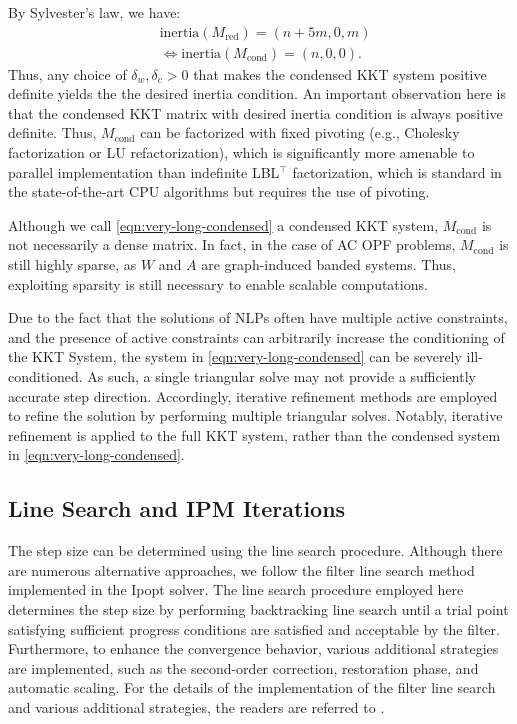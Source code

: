 By Sylvester's law, we have:
\begin{align*}
  &\text{inertia}(M_\text{red}) = (n+5m,0,m)\\
  &\iff \text{inertia}(M_\text{cond}) = (n,0,0).
\end{align*}
Thus, any choice of $\delta_w,\delta_c>0$ that makes the condensed KKT
system positive definite yields the the desired inertia condition.
An important observation here is that the condensed KKT matrix
with desired inertia condition is always positive definite.
Thus, $M_{\text{cond}}$ can be factorized with fixed pivoting (e.g.,
Cholesky factorization or LU refactorization), which is significantly
more amenable to parallel implementation than indefinite LBL$^\top$
factorization, which is standard in the state-of-the-art CPU
algorithms but requires the use of pivoting.

Although we call \eqref{eqn:very-long-condensed} a condensed KKT system,
$M_\text{cond}$ is not necessarily a dense matrix. In fact, in the case of
AC OPF problems, $M_\text{cond}$ is still highly sparse, as $W$
and $A$ are graph-induced banded systems. Thus, exploiting sparsity is
still necessary to enable scalable computations.

Due to the fact that the solutions of NLPs often have multiple active
constraints, and the presence of active constraints can arbitrarily
increase the conditioning of the KKT System, the system in
\eqref{eqn:very-long-condensed} can be severely
ill-conditioned. As such, a single triangular solve may not provide a
sufficiently accurate step direction. Accordingly, iterative
refinement methods are employed to refine the solution by performing
multiple triangular solves. Notably, iterative refinement is applied
to the full KKT system, rather than the condensed system in
\eqref{eqn:very-long-condensed}.

\subsection{Line Search and IPM Iterations}

The step size can be determined using the line search procedure.
Although there are numerous alternative approaches, we follow the
filter line search method implemented in the Ipopt solver. The line
search procedure employed here determines the step size by performing
backtracking line search until a trial point satisfying sufficient
progress conditions are satisfied and acceptable by the
filter. Furthermore, to enhance the convergence behavior, various
additional strategies are implemented, such as the second-order
correction, restoration phase, and automatic scaling. For the details
of the implementation of the filter line search and various additional
strategies, the readers are referred to
\cite{wachter2006implementation}.

